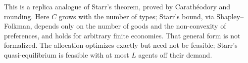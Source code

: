 \begin{remark}[Scope]
This is a replica analogue of Starr's theorem, proved by Carath\'eodory and rounding. Here $C$ grows with the number of
types; Starr's bound, via Shapley--Folkman, depends only on the number of goods and the non-convexity of preferences, and
holds for arbitrary finite economies. That general form is not formalized. The allocation optimizes exactly but need not
be feasible; Starr's quasi-equilibrium is feasible with at most $L$ agents off their demand.
\end{remark}
